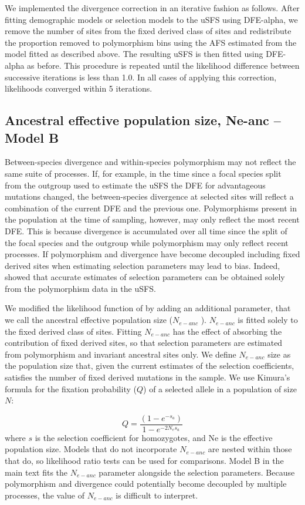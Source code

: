 We implemented the divergence correction in an iterative fashion as follows. After fitting demographic models or selection models to the uSFS using DFE-alpha, we remove the number of sites from the fixed derived class of sites and redistribute the proportion removed to polymorphism bins using the AFS estimated from the model fitted as described above. The resulting uSFS is then fitted using DFE-alpha as before. This procedure is repeated until the likelihood difference between successive iterations is less than 1.0. In all cases of applying this correction, likelihoods converged within 5 iterations.

\subsection{Ancestral effective population size, Ne-anc – Model B}

Between-species divergence and within-species polymorphism may not reflect the same suite of processes. If, for example, in the time since a focal species split from the outgroup used to estimate the uSFS the DFE for advantageous mutations changed, the between-species divergence at selected sites will reflect a combination of the current DFE and the previous one. Polymorphisms present in the population at the time of sampling, however, may only reflect the most recent DFE. This is because divergence is accumulated over all time since the split of the focal species and the outgroup while polymorphism may only reflect recent processes. If polymorphism and divergence have become decoupled including fixed derived sites when estimating selection parameters may lead to bias. Indeed,  \cite{RN354} showed that accurate estimates of selection parameters can be obtained solely from the polymorphism data in the uSFS. 

We modified the likelihood function of \cite{RN210} by adding an additional parameter, that we call the ancestral effective population size ($N_{e-anc}$ ). $N_{e-anc}$  is fitted solely to the fixed derived class of sites. Fitting $N_{e-anc}$  has the effect of absorbing the contribution of fixed derived sites, so that selection parameters are estimated from polymorphism and invariant ancestral sites only. We define $N_{e-anc}$ size as the population size that, given the current estimates of the selection coefficients, satisfies the number of fixed derived mutations in the sample. We use Kimura’s formula for the fixation probability ($Q$) of a selected allele in a population of size $N$:

\begin{equation}
Q = \frac{(1 - e^{-s_a})}{1-e^{-2N_es_a}}
\end{equation}
where $s$ is the selection coefficient for homozygotes, and Ne is the effective population size. Models that do not incorporate $N_{e-anc}$ are nested within those that do, so likelihood ratio tests can be used for comparisons. Model B in the main text fits the $N_{e-anc}$ parameter alongside the selection parameters. Because polymorphism and divergence could potentially become decoupled by multiple processes, the value of $N_{e-anc}$ is difficult to interpret. 
